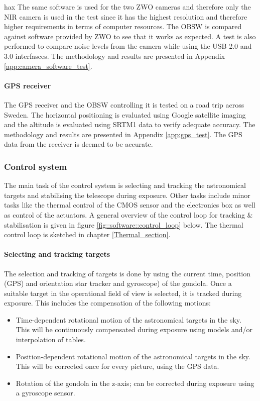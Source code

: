 hax The same software is used for the two ZWO cameras and therefore only the NIR camera is used in the test since it has the highest resolution and therefore higher requirements in terms of computer resources. The OBSW is compared against software provided by ZWO to see that it works as expected. A test is also performed to compare noise levels from the camera while using the USB 2.0 and 3.0 interfasces. The methodology and results are presented in Appendix \ref{app:camera_software_test}.

\paragraph{GPS receiver}

The GPS receiver and the OBSW controlling it is tested on a road trip across Sweden. The horizontal positioning is evaluated using Google satellite imaging and the altitude is evaluated using SRTM1 data to verify adequate accuracy. The methodology and results are presented in Appendix \ref{app:gps_test}. The GPS data from the receiver is deemed to be accurate.


\subsubsection{Control system}
The main task of the control system is selecting and tracking the astronomical targets and stabilising the telescope during exposure. Other tasks include minor tasks like the thermal control of the CMOS sensor and the electronics box as well as control of the actuators. A general overview of the control loop for tracking \& stabilisation is given in figure  \mbox{\ref{fig::software::control_loop}} below. The thermal control loop is sketched in chapter \mbox{\ref{Thermal_section}}.

\paragraph{Selecting and tracking targets}

The selection and tracking of targets is done by using the current time, position (GPS) and orientation star tracker and gyroscope) of the gondola. Once a suitable target in the operational field of view is selected, it is tracked during exposure. This includes the compensation of the following motions:
\begin{itemize}
	\item Time-dependent rotational motion of the astronomical targets in the sky. This will be continuously compensated during exposure using models and/or interpolation of tables.
	\item Position-dependent rotational motion of the astronomical targets in the sky. This will be corrected once for every picture, using the GPS data.
	\item Rotation of the gondola in the z-axis; can be corrected during exposure using a gyroscope sensor.
\end{itemize}

